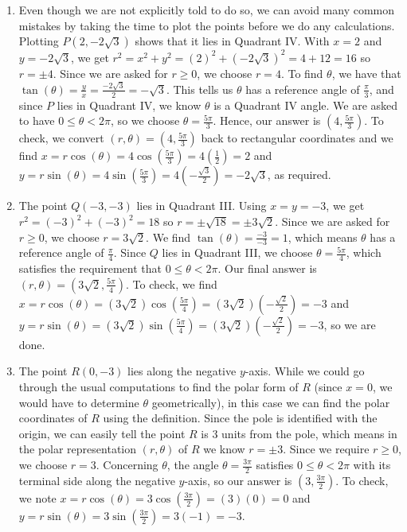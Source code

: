 {
\begin{enumerate}

\item  Even though we are not explicitly told to do so, we can avoid many common mistakes by taking the time to plot the points before we do any calculations.  Plotting $P\left(2,-2\sqrt{3}\right)$ shows that it lies in Quadrant IV.  With $x = 2$ and $y = -2\sqrt{3}$, we get $r^2 = x^2 + y^2 = (2)^2 + \left(-2\sqrt{3}\right)^2 = 4+12 = 16$ so $r = \pm 4$.  Since we are asked for $r \geq 0$, we choose $r = 4$.  To find $\theta$, we have that $\tan(\theta) = \frac{y}{x} = \frac{-2\sqrt{3}}{2} = -\sqrt{3}$.  This tells us $\theta$ has a reference angle of $\frac{\pi}{3}$, and  since $P$ lies in Quadrant IV, we know $\theta$ is a Quadrant IV angle.   We are asked to have $0 \leq \theta < 2\pi$, so we choose $\theta = \frac{5\pi}{3}$.  Hence, our answer is  $\left(4, \frac{5\pi}{3}\right)$.  To check, we convert $(r,\theta) = \left(4, \frac{5\pi}{3}\right)$ back to rectangular coordinates and we find $x = r \cos(\theta) = 4 \cos\left(\frac{5\pi}{3}\right) = 4 \left(\frac{1}{2}\right) =  2$ and  $y = r \sin(\theta) = 4 \sin\left(\frac{5\pi}{3}\right) = 4 \left(-\frac{\sqrt{3}}{2}\right) = -2\sqrt{3}$, as required.

\item  The point $Q(-3,-3)$ lies in Quadrant III.  Using $x = y = -3$, we get  $r^2 = (-3)^2 + (-3)^2 = 18$ so $r = \pm \sqrt{18} = \pm 3\sqrt{2}$.  Since we are asked for $r \geq 0$, we choose $r = 3 \sqrt{2}$.  We find $\tan(\theta) = \frac{-3}{-3} = 1$, which means $\theta$ has a reference angle of $\frac{\pi}{4}$.  Since $Q$ lies in Quadrant III, we choose $\theta = \frac{5\pi}{4}$, which satisfies the requirement that $0 \leq \theta < 2\pi$.  Our final answer is  $(r,\theta) = \left(3\sqrt{2}, \frac{5\pi}{4}\right)$.  To check, we find $x = r\cos(\theta) = (3\sqrt{2}) \cos\left(\frac{5\pi}{4}\right) = (3\sqrt{2})\left(-\frac{\sqrt{2}}{2}\right) = -3$ and $y = r\sin(\theta) = (3\sqrt{2}) \sin\left(\frac{5\pi}{4}\right) = (3\sqrt{2})\left(-\frac{\sqrt{2}}{2}\right) = -3$, so we are done.


\item The point $R(0,-3)$ lies along the negative $y$-axis.  While we could go through the usual computations to find the polar form of $R$  (since $x=0$, we would have to determine $\theta$ geometrically), in this case we can find the polar coordinates of $R$ using the definition. Since the pole is identified with the origin, we can easily tell the point $R$ is $3$ units from the pole, which means in the polar representation $(r, \theta)$ of $R$ we know $r = \pm 3$.  Since we require $r \geq 0$, we choose $r = 3$.  Concerning $\theta$, the angle $\theta = \frac{3\pi}{2}$ satisfies $0 \leq \theta < 2\pi$ with its terminal side along the negative $y$-axis, so our answer is $\left(3, \frac{3\pi}{2}\right)$.  To check, we note $x = r \cos(\theta) = 3 \cos\left( \frac{3\pi}{2}\right) = (3)(0) = 0$ and $y = r \sin(\theta) = 3 \sin\left( \frac{3\pi}{2}\right) = 3(-1) = -3$.



\end{enumerate}}
